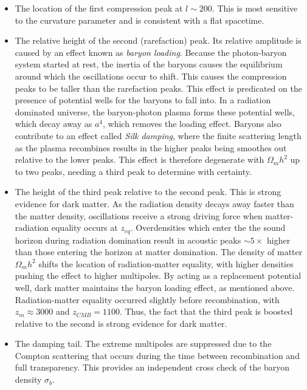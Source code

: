 \begin{itemize}
    \item The location of the first compression peak at $l\sim200$. 
    This is most sensitive to the curvature parameter and is consistent with a flat spacetime.
    \item The relative height of the second (rarefaction) peak.
    Its relative amplitude is caused by an effect known as \textit{baryon loading}. 
    Because the photon-baryon system started at rest, the inertia of the baryons causes the equilibrium around which the oscillations occur to shift. 
    This causes the  compression peaks to be taller than the rarefaction peaks.
    This effect is predicated on the presence of potential wells for the baryons to fall into. 
    In a radiation dominated universe, the baryon-photon plasma forms these potential wells, which decay away as $a^4$, which removes the loading effect.
    Baryons also contribute to an effect called \textit{Silk damping}, where the finite scattering length as the plasma recombines results in the higher peaks being smoothes out relative to the lower peaks.
    This effect is therefore degenerate with $\Omega_m h^2$ up to two peaks, needing a third peak to determine with certainty.
    \item The height of the third peak relative to the second peak.
    This is  strong evidence for dark matter\cite{hu_cmb_2003}.
    As the radiation density decays away faster than the matter density, oscillations receive a strong driving force when matter-radiation equality occurs at $z_{eq}$.
    Overdensities which  enter the the sound horizon during radiation domination result in acoustic peaks $\sim 5\times$ higher than those entering the horizon at matter domination.
    The density of matter $\Omega_m h^2$ shifts the location of radiation-matter equality, with higher densities pushing the effect to higher multipoles.
    By acting as a replacement potential well, dark matter maintains the baryon loading effect, as mentioned above.
    Radiation-matter equality occurred  slightly before recombination, with $z_m \approx 3000$ and $z_{CMB}=1100$.
    Thus, the fact that the third peak is boosted relative to the second is strong evidence for dark matter.
    \item The damping tail.
    The extreme multipoles are suppressed due to the Compton scattering that occurs during the time between recombination and full transparency.
    This provides an independent cross check of the baryon density $\sigma_b$.
\end{itemize}

